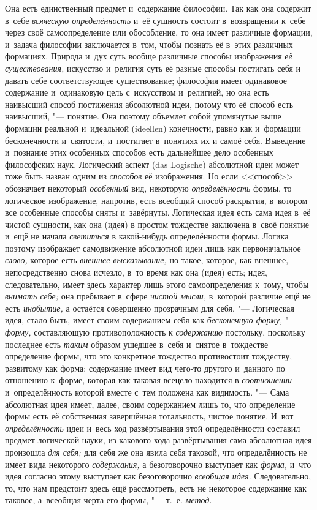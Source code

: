 Она есть единственный предмет и~содержание философии. Так как
она содержит в~себе {\em всяческую
определённость} и~её сущность состоит в~возвращении к~себе
через своё самоопределение или обособление, то она имеет различные
формации, и~задача философии заключается в~том, чтобы познать её в~этих
различных формациях. Природа и~дух суть вообще различные способы
изображения {\em её существования,}
искусство и~религия суть её разные способы постигать себя и
давать себе соответствующее существование; философия имеет одинаковое
содержание и~одинаковую цель с~искусством и~религией, но она
есть наивысший способ постижения абсолютной идеи, потому что её способ есть
наивысший, "--- понятие. Она поэтому объемлет собой упомянутые
выше формации реальной и~идеальной (ideellen) конечности,
равно как и~формации бесконечности и~святости, и~постигает в~понятиях их и
самоё себя. Выведение и~познание этих особенных способов есть дальнейшее
дело особенных философских наук. Логический аспект (das Logische)
абсолютной идеи может тоже быть назван одним из
{\em способов} её
изображения. Но если <<способ>> обозначает некоторый
{\em особенный} вид,
некоторую {\em определённость}
формы, то логическое изображение, напротив, есть всеобщий
способ раскрытия, в~котором все особенные способы сняты и~завёрнуты.
Логическая идея есть сама идея в~её чистой сущности, как она (идея) в
простом тождестве заключена в~своё понятие и~ещё не начала
{\em светиться} в
какой-нибудь определённости формы. Логика поэтому изображает самодвижение
абсолютной идеи лишь как первоначальное
{\em слово,} которое есть
{\em внешнее высказывание,}
но такое, которое, как внешнее, непосредственно снова
исчезло, в~то время как она (идея) есть; идея, следовательно, имеет здесь
характер лишь этого самоопределения к~тому, чтобы
{\em внимать себе;} она
пребывает в~сфере {\em чистой мысли,}
в~которой различие ещё не есть
{\em инобытие,} а
остаётся совершенно прозрачным для себя. "--- Логическая идея,
стало быть, имеет своим содержанием себя как
{\em бесконечную форму,} "---
{\em форму,} составляющую
противоположность к {\em содержанию}
постольку, поскольку последнее есть
{\em таким} образом
ушедшее в~себя и~снятое в~тождестве определение формы, что это конкретное
тождество противостоит тождеству, развитому как форма; содержание имеет вид
чего-то другого и~данного по отношению к~форме, которая как таковая всецело
находится в {\em соотношении}
и~определённость которой вместе с~тем положена как
видимость. "--- Сама абсолютная идея имеет, далее, своим
содержанием лишь то, что определение формы есть её собственная завершённая
тотальность, чистое понятие. И~вот
{\em определённость} идеи
и~весь ход развёртывания этой определённости составил предмет логической
науки, из какового хода развёртывания сама абсолютная идея произошла
{\em для себя;} для себя
же она явила себя таковой, что определённость не имеет вида некоторого
{\em содержания,} а
безоговорочно выступает как
{\em форма,} и~что идея
согласно этому выступает как безоговорочно
{\em всеобщая идея}.
Следовательно, то, что нам предстоит здесь ещё рассмотреть,
есть не некоторое содержание как таковое, а~всеобщая черта его формы, "---
т.~е. {\em метод}.

